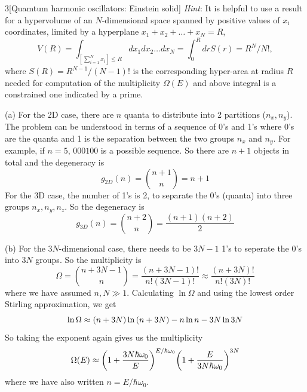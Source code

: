 \documentclass[12pt]{article}
\begin{document}
\begin{problem}{3}[Quamtum harmonic oscillators: Einstein solid]
\textit{Hint}: It is helpful to use a result for a hypervolume of an
$N$-dimensional space spanned by positive values of $x_i$ coordinates, limited
by a hyperplane $x_1+x_2+\hdots+x_N=R$,
\begin{equation}
    V(R)=\int_{[\sum_{i=1}^Nx_i]\leq R}dx_1dx_2\hdots
    dx_N=\int_0^RdrS(r)=R^N/N!,
\end{equation}
where $S(R)=R^{N-1}/(N-1)!$ is the corresponding hyper-area at radius $R$ needed
for computation of the multiplicity $\Omega(E)$ and above integral is a
constrained one indicated by a prime.
\begin{solution}
(a) For the 2D case, there are $n$ quanta to distribute into 2 partitions
($n_x,n_y$). The problem can be understood in terms of a sequence of 0's and 1's
where 0's are the quanta and 1 is the separation between the two groups $n_x$
and $n_y$. For example, if $n=5$, $000100$ is a possible sequence. So there are 
$n+1$ objects in total and the degeneracy is
\begin{equation}
    g_{2D}(n)=\binom{n+1}{n}=n+1 
\end{equation}
For the 3D case, the number of 1's is 2, to separate the 0's (quanta) into 
three groups $n_x,n_y,n_z$. So the degeneracy is
\begin{equation}
    g_{3D}(n)=\binom{n+2}{n}=\frac{(n+1)(n+2)}{2} 
\end{equation}

(b) For the $3N$-dimensional case, there needs to be $3N-1$ 1's to seperate the
0's into $3N$ groups. So the multiplicity is
\begin{equation}
    \Omega=\binom{n+3N-1}{n} 
    =\frac{(n+3N-1)!}{n!(3N-1)!}
    \approx\frac{(n+3N)!}{n!(3N)!}
\end{equation}
where we have assumed $n,N\gg 1$. Calculating $\ln\Omega$ and using the lowest
order Stirling approximation, we get
\begin{equation}
    \ln\Omega\approx(n+3N)\ln\qty(n+3N)-n\ln n-3N\ln 3N 
\end{equation}
So taking the exponent again gives us the multiplicity
\begin{equation}
    \Omega(E)\approx\qty(1+\frac{3N\hbar\omega_0}{E})^{E/\hbar\omega_0}
    \qty(1+\frac{E}{3N\hbar\omega_0})^{3N}
\end{equation}
where we have also written $n=E/\hbar\omega_0$.


\end{solution}
\end{problem}
\end{document}
